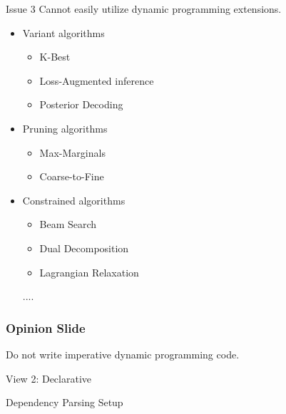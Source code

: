 \documentclass{beamer}
\def\im#1#2{
  \node(#1) [scale=#2]{\pgfbox[center,top]{\pgfuseimage{#1}}
};}
\newcommand{\air}{\vspace{0.5cm}}
\begin{document}
\begin{frame}{Issue 3}
  Cannot easily utilize dynamic programming extensions.

  \begin{itemize}
    \item Variant algorithms
      \begin{itemize}
        \item K-Best
        \item Loss-Augmented inference
        \item Posterior Decoding
      \end{itemize}
      \pause 
      \air 

    \item Pruning algorithms
      \begin{itemize}
      \item Max-Marginals
      \item Coarse-to-Fine
      \end{itemize}

      \pause 
      \air 

    \item Constrained algorithms
      \begin{itemize}
      \item Beam Search
      \item Dual Decomposition
      \item Lagrangian Relaxation
      \end{itemize}
      ....
  \end{itemize}
\end{frame}

\begin{frame}
  \frametitle{Opinion Slide}
  Do not write imperative dynamic programming code.
\end{frame}

\begin{frame}
  \begin{center}
    \Large{View 2: Declarative}
  \end{center}
\end{frame}

\begin{frame}{Dependency Parsing Setup}
  \vspace{-4cm}
  \begin{figure}
    \centering
  \end{figure}
\end{frame}
\end{document}
